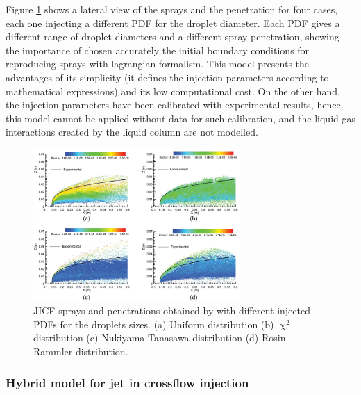Figure \ref{fig:fan_2018_jets_penetration} shows a lateral view of the sprays and the penetration for four cases, each one injecting a different PDF for the droplet diameter. Each PDF gives a different range of droplet diameters and a different spray penetration, showing the importance of chosen accurately the initial boundary conditions for reproducing sprays with lagrangian formalism. This model presents the advantages of its simplicity (it defines the injection parameters according to mathematical expressions) and its low computational cost. On the other hand, the injection parameters have been calibrated with experimental results, hence this model cannot be applied without data for such calibration, and the liquid-gas interactions created by the liquid column are not modelled.

\begin{figure}[ht]
    \centering
    \includegraphics[width=0.7\textwidth]{./part1_numerical_approaches/figures_ch3/fan_2018_jets_penetration}
       \centering
    \caption{JICF sprays and penetrations obtained by  with different injected PDFs for the droplets sizes. (a) Uniform distribution (b) $\upchi^2$ distribution (c) Nukiyama-Tanasawa distribution (d) Rosin-Rammler distribution.}
    \label{fig:fan_2018_jets_penetration}
\end{figure}



\subsubsection*{Hybrid model for jet in crossflow injection }


